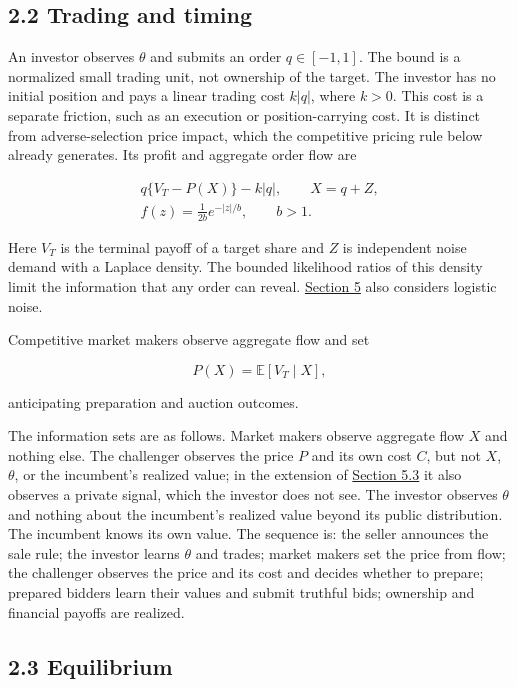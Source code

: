 \documentclass[
  12pt,
]{article}
\begin{document}
\subsection{2.2 Trading and timing}\label{sec-trading-and-timing}

An investor observes \(\theta\) and submits an order \(q\in[-1,1]\). The
bound is a normalized small trading unit, not ownership of the target.
The investor has no initial position and pays a linear trading cost
\(k|q|\), where \(k>0\). This cost is a separate friction, such as an
execution or position-carrying cost. It is distinct from
adverse-selection price impact, which the competitive pricing rule below
already generates. Its profit and aggregate order flow are

\[
\begin{gathered}
q\{V_T-P(X)\}-k|q|,\qquad X=q+Z,\\
f(z)=\frac{1}{2b}e^{-|z|/b},\qquad b>1.
\end{gathered}
\tag{2}\label{eq:paper-2}
\]

Here \(V_T\) is the terminal payoff of a target share and \(Z\) is
independent noise demand with a Laplace density. The bounded likelihood
ratios of this density limit the information that any order can reveal.
\hyperref[sec-extensions]{Section 5} also considers logistic noise.

Competitive market makers observe aggregate flow and set

\[
P(X)=\mathbb E[V_T\mid X],
\tag{3}\label{eq:paper-3}
\]

anticipating preparation and auction outcomes.

The information sets are as follows. Market makers observe aggregate
flow \(X\) and nothing else. The challenger observes the price \(P\) and
its own cost \(C\), but not \(X\), \(\theta\), or the incumbent's
realized value; in the extension of
\hyperref[sec-complementary-private-information]{Section 5.3} it also
observes a private signal, which the investor does not see. The investor
observes \(\theta\) and nothing about the incumbent's realized value
beyond its public distribution. The incumbent knows its own value. The
sequence is: the seller announces the sale rule; the investor learns
\(\theta\) and trades; market makers set the price from flow; the
challenger observes the price and its cost and decides whether to
prepare; prepared bidders learn their values and submit truthful bids;
ownership and financial payoffs are realized.

\subsection{2.3 Equilibrium}\label{sec-equilibrium}
\end{document}
